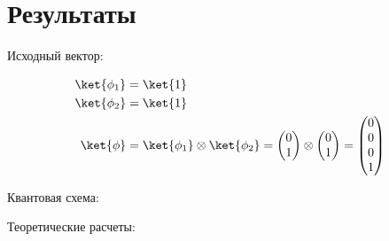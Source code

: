 \documentclass{article}
\begin{document}
\section{Результаты}

Исходный вектор: 
 
\begin{align}
  \ket{\phi_1} &= \ket{1}
  \\
  \ket{\phi_2} &= \ket{1}
  \\
  \ket{\phi} &= \ket{\phi_1} \otimes \ket{\phi_2} =\begin{pmatrix} 0 \\ 1
  \end{pmatrix} \otimes \begin{pmatrix}  0 \\ 1 \end{pmatrix}= \begin{pmatrix}
  0 \\ 0 \\ 0 \\ 1 \end{pmatrix}
\end{align}

Квантовая схема:
\begin{figure}[H]
\end{figure}

Теоретические расчеты:
 
\end{document}
